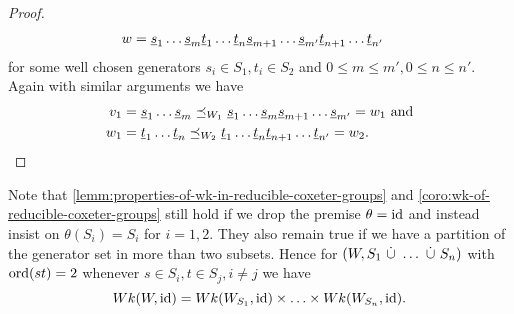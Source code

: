 \begin{coro}
\begin{proof}
\begin{align*}
			w	& = \underline{s}_1 \ldots \underline{s}_m \underline{t}_1 \ldots \underline{t}_n \underline{s}_{m+1} \ldots \underline{s}_{m'} \underline{t}_{n+1} \ldots \underline{t}_{n'}
		\end{align*}
		for some well chosen generators $s_i \in S_1, t_i \in S_2$ and $0 \leq m \leq m', 0 \leq n \leq n'$. Again with similar arguments we have 
		\begin{align*}
			v_1	& = \underline{s}_1 \ldots \underline{s}_m \preceq_{W_1} \underline{s}_1 \ldots \underline{s}_m \underline{s}_{m+1} \ldots \underline{s}_{m'} = w_1 \textrm{ and} \\
			w_1	& = \underline{t}_1 \ldots \underline{t}_n \preceq_{W_2} \underline{t}_1 \ldots \underline{t}_n \underline{t}_{n+1} \ldots \underline{t}_{n'} = w_2. \qedhere
		\end{align*}
	\end{proof}
\end{coro}

\begin{rema}
	Note that \ref{lemm:properties-of-wk-in-reducible-coxeter-groups} and \ref{coro:wk-of-reducible-coxeter-groups} still hold if we drop the premise $\theta = \operatorname{id}$ and instead insist on $\theta(S_i) = S_i$ for $i=1,2$. They also remain true if we have a partition of the generator set in more than two subsets. Hence for $(W,S_1 \ \dot \cup \  \ldots \ \dot \cup \  S_n)$ with $\operatorname{ord}(st) = 2$ whenever $s \in S_i, t \in S_j, i \neq j$ we have
	$$ Wk(W,\operatorname{id}) = Wk(W_{S_1},\operatorname{id}) \times \ldots \times Wk(W_{S_n},\operatorname{id}). $$
\end{rema}

